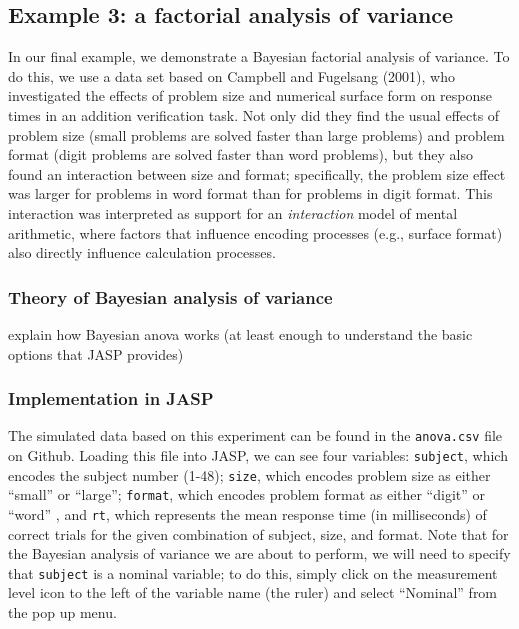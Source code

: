 \documentclass[english,,doc,floatsintext]{apa6}
\begin{document}
\hypertarget{example-3-a-factorial-analysis-of-variance}{%
\subsection{Example 3: a factorial analysis of variance}\label{example-3-a-factorial-analysis-of-variance}}

In our final example, we demonstrate a Bayesian factorial analysis of variance. To do this, we use a data set based on Campbell and Fugelsang (2001), who investigated the effects of problem size and numerical surface form on response times in an addition verification task. Not only did they find the usual effects of problem size (small problems are solved faster than large problems) and problem format (digit problems are solved faster than word problems), but they also found an interaction between size and format; specifically, the problem size effect was larger for problems in word format than for problems in digit format. This interaction was interpreted as support for an \emph{interaction} model of mental arithmetic, where factors that influence encoding processes (e.g., surface format) also directly influence calculation processes.

\hypertarget{theory-of-bayesian-analysis-of-variance}{%
\subsubsection{Theory of Bayesian analysis of variance}\label{theory-of-bayesian-analysis-of-variance}}

explain how Bayesian anova works (at least enough to understand the basic options that JASP provides)

\hypertarget{implementation-in-jasp-2}{%
\subsubsection{Implementation in JASP}\label{implementation-in-jasp-2}}

The simulated data based on this experiment can be found in the \texttt{anova.csv} file on Github. Loading this file into JASP, we can see four variables: \texttt{subject}, which encodes the subject number (1-48); \texttt{size}, which encodes problem size as either \enquote{small} or \enquote{large}; \texttt{format}, which encodes problem format as either \enquote{digit} or \enquote{word} , and \texttt{rt}, which represents the mean response time (in milliseconds) of correct trials for the given combination of subject, size, and format. Note that for the Bayesian analysis of variance we are about to perform, we will need to specify that \texttt{subject} is a nominal variable; to do this, simply click on the measurement level icon to the left of the variable name (the ruler) and select \enquote{Nominal} from the pop up menu.
\end{document}
